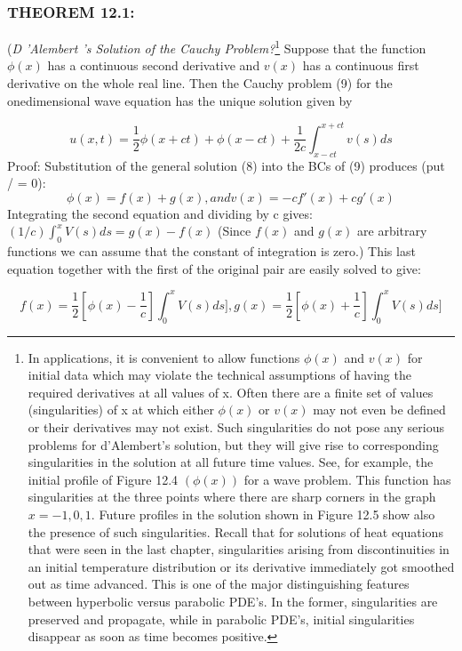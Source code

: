\documentclass[../main.tex]{subfiles}
\begin{document}
\subsubsection{THEOREM 12.1:}
(\emph{D 'Alembert 's Solution of the Cauchy Problem?}\footnote
{ In applications, it is convenient to allow functions $\phi(x)$ and $v(x)$ for initial data which may violate
the technical assumptions of having the required derivatives at all values of x. Often there are a finite
set of values (singularities) of x at which either $\phi(x)$ or $v(x)$ may not even be defined or their
derivatives may not exist. Such singularities do not pose any serious problems for d'Alembert's
solution, but they will give rise to corresponding singularities in the solution at all future time values.
See, for example, the initial profile of Figure 12.4 $(\phi(x))$ for a wave problem.  This function has
singularities at the three points where there are sharp corners in the graph $x = -1 , 0, 1$. Future profiles
in the solution shown in Figure 12.5 show also the presence of such singularities. Recall that for
solutions of heat equations that were seen in the last chapter, singularities arising from discontinuities
in an initial temperature distribution or its derivative immediately got smoothed out as time advanced.
This is one of the major distinguishing features between hyperbolic versus parabolic PDE's. In the
former, singularities are preserved and propagate, while in parabolic PDE's, initial singularities
disappear as soon as time becomes positive.} 
Suppose that
the function $\phi(x)$ has a continuous second derivative and $v(x)$ has a continuous
first derivative on the whole real line. Then the Cauchy problem (9) for the onedimensional wave equation has the unique solution given by 

\begin{equation} \label{eqa10}
u(x,t)=\dfrac{1}{2} \phi(x+ct)+\phi(x-ct)+\dfrac{1}{2c} \int_{x-ct}^{x+ct} v(s)ds
\end{equation}
Proof: Substitution of the general solution (8) into the BCs of (9) produces (put /
= 0): 
$$\phi(x)=f(x)+g(x), and v(x)=-cf'(x)+cg'(x)$$
Integrating the second equation and dividing by c gives:$(1/c) \int_{0}^{x} V(s)ds=g(x)-f(x)$
(Since $f(x)$ and $g(x)$ are arbitrary functions we can assume that the
constant of integration is zero.) This last equation together with the first of the
original pair are easily solved to give:

$$f(x)=\dfrac{1}{2}[\phi(x)-\dfrac{1}{c}] \int_{0}^{x} V(s)ds] , g(x)=\dfrac{1}{2}[\phi(x)+\dfrac{1}{c}] \int_{0}^{x} V(s)ds]$$
\end{document}
